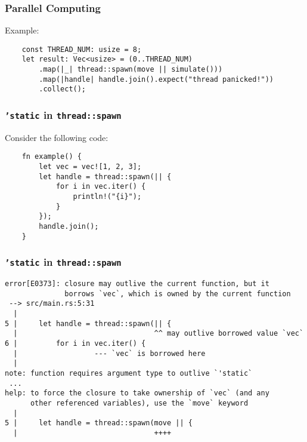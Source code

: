 \documentclass[aspectratio=1610,t]{beamer}
\begin{document}
\begin{frame}[fragile]
\frametitle{Parallel Computing}
Example:

\begin{verbatim}
    const THREAD_NUM: usize = 8;
    let result: Vec<usize> = (0..THREAD_NUM)
        .map(|_| thread::spawn(move || simulate()))
        .map(|handle| handle.join().expect("thread panicked!"))
        .collect();
\end{verbatim}


\end{frame}


\begin{frame}[fragile]
\frametitle{\texttt{'static} in \texttt{thread::spawn}}
Consider the following code:

\begin{verbatim}
    fn example() {
        let vec = vec![1, 2, 3];
        let handle = thread::spawn(|| {
            for i in vec.iter() {
                println!("{i}");
            }
        });
        handle.join();
    }
\end{verbatim}
\end{frame}


\begin{frame}[fragile]
\frametitle{\texttt{'static} in \texttt{thread::spawn}}
\begin{verbatim}
error[E0373]: closure may outlive the current function, but it
              borrows `vec`, which is owned by the current function
 --> src/main.rs:5:31
  |
5 |     let handle = thread::spawn(|| {
  |                                ^^ may outlive borrowed value `vec`
6 |         for i in vec.iter() {
  |                  --- `vec` is borrowed here
  |
note: function requires argument type to outlive `'static`
 ...
help: to force the closure to take ownership of `vec` (and any
      other referenced variables), use the `move` keyword
  |
5 |     let handle = thread::spawn(move || {
  |                                ++++
\end{verbatim}
\end{frame}
\end{document}
